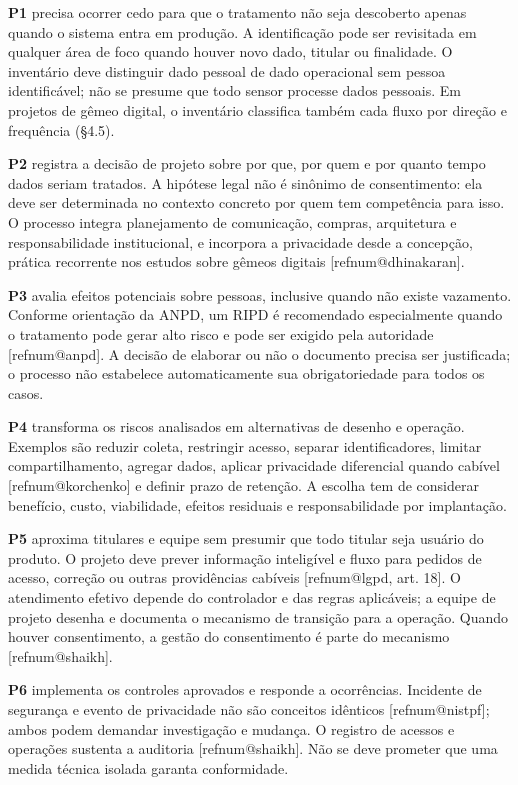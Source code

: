 \documentclass[11pt,a4paper]{article}
\makeatletter
\newcommand{\refnum}[1]{\csname refnum@#1\endcsname}
\makeatother
\begin{document}
\textbf{P1} precisa ocorrer cedo para que o tratamento não seja descoberto apenas quando o sistema entra em produção. A identificação pode ser revisitada em qualquer área de foco quando houver novo dado, titular ou finalidade. O inventário deve distinguir dado pessoal de dado operacional sem pessoa identificável; não se presume que todo sensor processe dados pessoais. Em projetos de gêmeo digital, o inventário classifica também cada fluxo por direção e frequência (§4.5).

\textbf{P2} registra a decisão de projeto sobre por que, por quem e por quanto tempo dados seriam tratados. A hipótese legal não é sinônimo de consentimento: ela deve ser determinada no contexto concreto por quem tem competência para isso. O processo integra planejamento de comunicação, compras, arquitetura e responsabilidade institucional, e incorpora a privacidade desde a concepção, prática recorrente nos estudos sobre gêmeos digitais [\refnum{dhinakaran}].

\textbf{P3} avalia efeitos potenciais sobre pessoas, inclusive quando não existe vazamento. Conforme orientação da ANPD, um RIPD é recomendado especialmente quando o tratamento pode gerar alto risco e pode ser exigido pela autoridade [\refnum{anpd}]. A decisão de elaborar ou não o documento precisa ser justificada; o processo não estabelece automaticamente sua obrigatoriedade para todos os casos.

\textbf{P4} transforma os riscos analisados em alternativas de desenho e operação. Exemplos são reduzir coleta, restringir acesso, separar identificadores, limitar compartilhamento, agregar dados, aplicar privacidade diferencial quando cabível [\refnum{korchenko}] e definir prazo de retenção. A escolha tem de considerar benefício, custo, viabilidade, efeitos residuais e responsabilidade por implantação.

\textbf{P5} aproxima titulares e equipe sem presumir que todo titular seja usuário do produto. O projeto deve prever informação inteligível e fluxo para pedidos de acesso, correção ou outras providências cabíveis [\refnum{lgpd}, art. 18]. O atendimento efetivo depende do controlador e das regras aplicáveis; a equipe de projeto desenha e documenta o mecanismo de transição para a operação. Quando houver consentimento, a gestão do consentimento é parte do mecanismo [\refnum{shaikh}].

\textbf{P6} implementa os controles aprovados e responde a ocorrências. Incidente de segurança e evento de privacidade não são conceitos idênticos [\refnum{nistpf}]; ambos podem demandar investigação e mudança. O registro de acessos e operações sustenta a auditoria [\refnum{shaikh}]. Não se deve prometer que uma medida técnica isolada garanta conformidade.
\end{document}
